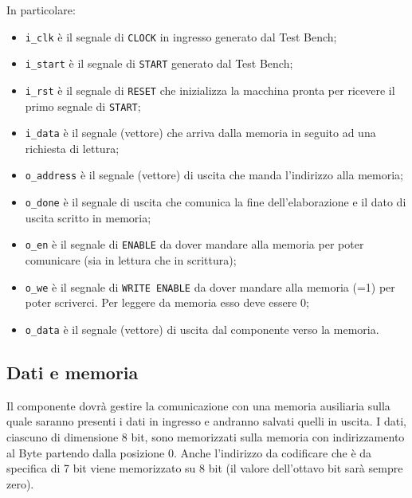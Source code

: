 In particolare:
\begin{itemize}
	\item \lstinline[columns=fixed]{i_clk} è il segnale di \lstinline[columns=fixed]{CLOCK} in ingresso generato dal Test Bench;
	
	\item \lstinline[columns=fixed]{i_start} è il segnale di \lstinline[columns=fixed]{START} generato dal Test Bench;
	
	\item \lstinline[columns=fixed]{i_rst} è il segnale di \lstinline[columns=fixed]{RESET} che inizializza la macchina pronta per ricevere il primo segnale di \lstinline[columns=fixed]{START};
	
	\item \lstinline[columns=fixed]{i_data} è il segnale (vettore) che arriva dalla memoria in seguito ad una richiesta di lettura;
	
	\item \lstinline[columns=fixed]{o_address} è il segnale (vettore) di uscita che manda l'indirizzo alla memoria;
	
	\item \lstinline[columns=fixed]{o_done} è il segnale di uscita che comunica la fine dell'elaborazione e il dato di uscita scritto in memoria;
	
	\item \lstinline[columns=fixed]{o_en} è il segnale di \lstinline[columns=fixed]{ENABLE} da dover mandare alla memoria per poter comunicare (sia in lettura che in scrittura);
	
	\item \lstinline[columns=fixed]{o_we} è il segnale di \lstinline[columns=fixed]{WRITE ENABLE} da dover mandare alla memoria (=1) per poter scriverci. Per leggere da memoria esso deve essere 0;
	
	\item \lstinline[columns=fixed]{o_data} è il segnale (vettore) di uscita dal componente verso la memoria.
\end{itemize}

\subsection{Dati e memoria}
Il componente dovrà gestire la comunicazione con una memoria ausiliaria sulla quale saranno presenti i dati in ingresso e andranno salvati quelli in uscita.\newline
I dati, ciascuno di dimensione 8 bit, sono memorizzati sulla memoria con indirizzamento al Byte partendo dalla posizione 0.
Anche l'indirizzo da codificare che è da specifica di 7 bit viene memorizzato su 8 bit (il valore dell'ottavo bit sarà sempre zero).


